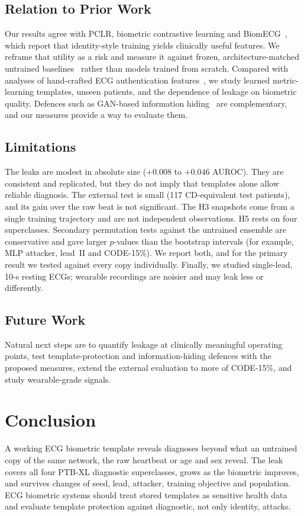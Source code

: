\documentclass[journal]{IEEEtran}
\begin{document}
\subsection{Relation to Prior Work}
Our results agree with PCLR, biometric contrastive learning and BiomECG~\cite{diamant2022pclr,sangha2024bcl,thiebaud2026biomecg}, which report that identity-style training yields clinically useful features. We reframe that utility as a risk and measure it against frozen, architecture-matched untrained baselines~\cite{berger2026position} rather than models trained from scratch. Compared with analyses of hand-crafted ECG authentication features~\cite{noh2022broken}, we study learned metric-learning templates, unseen patients, and the dependence of leakage on biometric quality. Defences such as GAN-based information hiding~\cite{kang2023gan} are complementary, and our measures provide a way to evaluate them.

\subsection{Limitations}
The leaks are modest in absolute size ($+0.008$ to $+0.046$ AUROC). They are consistent and replicated, but they do not imply that templates alone allow reliable diagnosis. The external test is small (117 CD-equivalent test patients), and its gain over the raw beat is not significant. The H3 snapshots come from a single training trajectory and are not independent observations. H5 rests on four superclasses. Secondary permutation tests against the untrained ensemble are conservative and gave larger $p$-values than the bootstrap intervals (for example, MLP attacker, lead~II and CODE-15\%). We report both, and for the primary result we tested against every copy individually. Finally, we studied single-lead, 10-s resting ECGs; wearable recordings are noisier and may leak less or differently.

\subsection{Future Work}
Natural next steps are to quantify leakage at clinically meaningful operating points, test template-protection and information-hiding defences with the proposed measures, extend the external evaluation to more of CODE-15\%, and study wearable-grade signals.

\section{Conclusion}
A working ECG biometric template reveals diagnoses beyond what an untrained copy of the same network, the raw heartbeat or age and sex reveal. The leak covers all four PTB-XL diagnostic superclasses, grows as the biometric improves, and survives changes of seed, lead, attacker, training objective and population. ECG biometric systems should treat stored templates as sensitive health data and evaluate template protection against diagnostic, not only identity, attacks.
\end{document}
